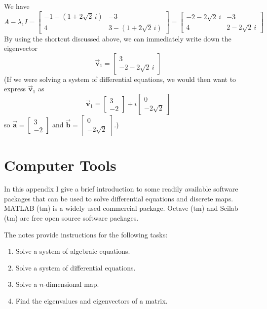 \documentclass[reqno]{immbook}
\newcommand{\BA}{\vec{\textbf{a}}}
\newcommand{\BB}{\vec{\textbf{b}}}
\newcommand{\BV}{\vec{\textbf{v}}}
\begin{document}
We have
\[
   A - \lambda_1 I = \begin{bmatrix}
                        -1-(1+2\sqrt{2}\,i) & -3 \\
			4 & 3-(1+2\sqrt{2}\,i)
                     \end{bmatrix}
		   = \begin{bmatrix}
		        -2-2\sqrt{2}\, i & -3 \\
			4 & 2-2\sqrt{2}\,i
		     \end{bmatrix}
\]
By using the shortcut discussed above, we can
immediately write down the eigenvector
\[
  \BV_1 = \begin{bmatrix} 3 \\ -2-2\sqrt{2}\, i \end{bmatrix}
\]
(If we were solving a system of differential equations, we would
then want to express $\BV_1$ as
\[
   \BV_1 = \begin{bmatrix} 3 \\ -2 \end{bmatrix}
           + i \begin{bmatrix} 0 \\ -2\sqrt{2} \end{bmatrix}
\]
so $\BA = \begin{bmatrix} 3 \\ -2\end{bmatrix}$
and $\BB = \begin{bmatrix} 0 \\ -2\sqrt{2} \end{bmatrix}$.)
%
%
%
\chapter{Computer Tools}
%
%
In this appendix I give a brief introduction to some
readily available software packages that can be used to solve
differential equations and discrete maps.  MATLAB (tm)
is a widely used commercial package.  Octave (tm) and
Scilab (tm) are free open source software packages.

The notes provide instructions for the following tasks:
\begin{enumerate}
\item Solve a system of algebraic equations.
\item Solve a system of differential equations.
\item Solve a $n$-dimensional map.
\item Find the eigenvalues and eigenvectors of a matrix.
\end{enumerate}
\end{document}
